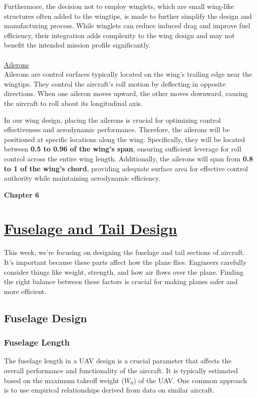 \documentclass[12 pt]{article}
\begin{document}
{Furthermore, the decision not to employ winglets, which are small wing-like structures often added to the wingtips, is made to further simplify the design and manufacturing process. While winglets can reduce induced drag and improve fuel efficiency, their integration adds complexity to the wing design and may not benefit the intended mission profile significantly.\\
\\ \vspace{5mm}
\color{red}
\large{\underline{Ailerons}}\\
\color{black}
Ailerons are control surfaces typically located on the wing's trailing edge near the wingtips. They control the aircraft's roll motion by deflecting in opposite directions. When one aileron moves upward, the other moves downward, causing the aircraft to roll about its longitudinal axis.

In our wing design, placing the ailerons is crucial for optimizing control effectiveness and aerodynamic performance. Therefore, the ailerons will be positioned at specific locations along the wing. Specifically, they will be located between \textbf{0.5 to 0.96 of the wing's span}, ensuring sufficient leverage for roll control across the entire wing length. Additionally, the ailerons will span from \textbf{0.8 to 1 of the wing's chord}, providing adequate surface area for effective control authority while maintaining aerodynamic efficiency.

\newpage

\textbf{\Huge{Chapter 6}}
\section{\underline{Fuselage and Tail Design}}
This week, we're focusing on designing the fuselage and tail sections of aircraft. It's important because these parts affect how the plane flies. Engineers carefully consider things like weight, strength, and how air flows over the plane. Finding the right balance between these factors is crucial for making planes safer and more efficient.
\color{red}
\subsection{Fuselage Design}
\subsubsection{Fuselage Length}
\color{black}
{The fuselage length in a UAV design is a crucial parameter that affects the overall performance and functionality of the aircraft. It is typically estimated based on the maximum takeoff weight (\(W_0\)) of the UAV. One common approach is to use empirical relationships derived from data on similar aircraft.}

}
\end{document}
